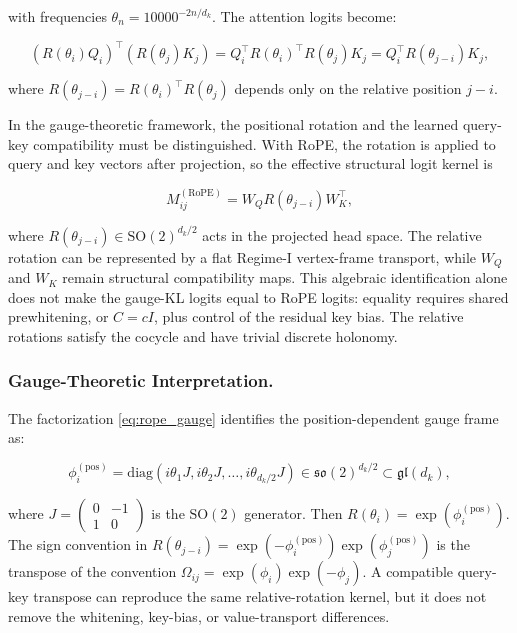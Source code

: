 \documentclass[twoside,11pt]{article}
\begin{document}
with frequencies $\theta_n = 10000^{-2n/d_k}$. The attention logits become:

\begin{equation}
(R(\theta_i) Q_i)^\top (R(\theta_j) K_j) = Q_i^\top R(\theta_i)^\top R(\theta_j) K_j = Q_i^\top R(\theta_{j-i}) K_j,
\label{eq:rope_relative}
\end{equation}

where $R(\theta_{j-i}) = R(\theta_i)^\top R(\theta_j)$ depends only on the relative position $j - i$.

In the gauge-theoretic framework, the positional rotation and the learned query-key compatibility must be distinguished. With RoPE, the rotation is applied to query and key vectors after projection, so the effective structural logit kernel is

\begin{equation}
M_{ij}^{(\mathrm{RoPE})} = W_QR(\theta_{j-i})W_K^\top,
\label{eq:rope_gauge}
\end{equation}

where $R(\theta_{j-i})\in\mathrm{SO}(2)^{d_k/2}$ acts in the projected head space. The relative rotation can be represented by a flat Regime-I vertex-frame transport, while $W_Q$ and $W_K$ remain structural compatibility maps. This algebraic identification alone does not make the gauge-KL logits equal to RoPE logits: equality requires shared prewhitening, or $C=cI$, plus control of the residual key bias. The relative rotations satisfy the cocycle and have trivial discrete holonomy.

\subsubsection{Gauge-Theoretic Interpretation.}

The factorization \eqref{eq:rope_gauge} identifies the position-dependent gauge frame as:

\begin{equation}
\phi_i^{(\mathrm{pos})} = \mathrm{diag}(i\theta_1 J, i\theta_2 J, \ldots, i\theta_{d_k/2} J) \in \mathfrak{so}(2)^{d_k/2} \subset \mathfrak{gl}(d_k),
\label{eq:rope_lie_algebra}
\end{equation}

where $J = \left(\begin{smallmatrix} 0 & -1 \\ 1 & 0 \end{smallmatrix}\right)$ is the $\mathrm{SO}(2)$ generator. Then $R(\theta_i)=\exp(\phi_i^{(\mathrm{pos})})$. The sign convention in $R(\theta_{j-i})=\exp(-\phi_i^{(\mathrm{pos})})\exp(\phi_j^{(\mathrm{pos})})$ is the transpose of the convention $\Omega_{ij}=\exp(\phi_i)\exp(-\phi_j)$. A compatible query-key transpose can reproduce the same relative-rotation kernel, but it does not remove the whitening, key-bias, or value-transport differences.
\end{document}
